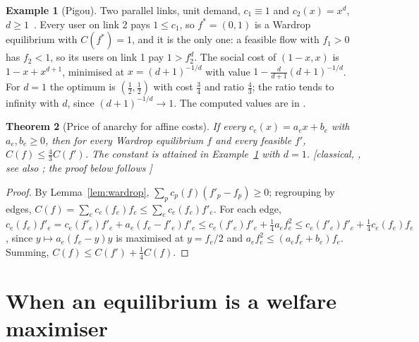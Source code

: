 \documentclass[11pt,a4paper]{article}
\theoremstyle{plain}
\newtheorem{theorem}{Theorem}[section]
\theoremstyle{definition}
\newtheorem{example}[theorem]{Example}
\theoremstyle{remark}
\newcommand{\status}[1]{\textsf{\small [#1]}}
\begin{document}
\begin{example}[Pigou]\label{ex:pigou}
Two parallel links, unit demand, $c_1\equiv 1$ and $c_2(x)=x^d$, $d\ge 1$~\citep{pigou1920}. Every user on link 2 pays $1\le c_1$, so $f^*=(0,1)$ is a Wardrop equilibrium with $C(f^*)=1$, and it is the only one: a feasible flow with $f_1>0$ has $f_2<1$, so its users on link 1 pay $1>f_2^d$. The social cost of $(1-x,x)$ is $1-x+x^{d+1}$, minimised at $x=(d+1)^{-1/d}$ with value $1-\tfrac{d}{d+1}(d+1)^{-1/d}$. For $d=1$ the optimum is $(\tfrac12,\tfrac12)$ with cost $\tfrac34$ and ratio $\tfrac43$; the ratio tends to infinity with $d$, since $(d+1)^{-1/d}\to 1$. The computed values are in .
\end{example}

\begin{theorem}[Price of anarchy for affine costs]\label{thm:poa}
If every $c_e(x)=a_ex+b_e$ with $a_e,b_e\ge 0$, then for every Wardrop equilibrium $f$ and every feasible $f'$, $C(f)\le\tfrac43C(f')$. The constant is attained in Example~\ref{ex:pigou} with $d=1$. \status{classical, \citealp{roughgardenTardos2002}, see also \citealp{roughgarden2005}; the proof below follows \citealp{correa2004}}
\end{theorem}
\begin{proof}
By Lemma~\ref{lem:wardrop}, $\sum_pc_p(f)(f'_p-f_p)\ge 0$; regrouping by edges, $C(f)=\sum_ec_e(f_e)f_e\le\sum_ec_e(f_e)f'_e$. For each edge,
$c_e(f_e)f'_e=c_e(f'_e)f'_e+a_e(f_e-f'_e)f'_e\le c_e(f'_e)f'_e+\tfrac14a_ef_e^2\le c_e(f'_e)f'_e+\tfrac14c_e(f_e)f_e$,
since $y\mapsto a_e(f_e-y)y$ is maximised at $y=f_e/2$ and $a_ef_e^2\le(a_ef_e+b_e)f_e$. Summing, $C(f)\le C(f')+\tfrac14C(f)$.
\end{proof}

\section{When an equilibrium is a welfare maximiser}\label{sec:when}
\end{document}
